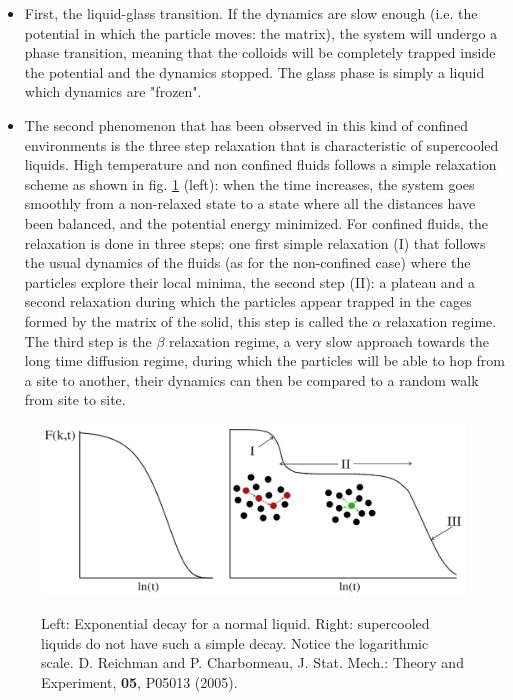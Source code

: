 \documentclass[a4paper,12pt]{article}
\newcommand{\jline}{\vspace{10pt}}
\begin{document}
\begin{itemize}

\item First, the liquid-glass transition. If the dynamics are slow enough (i.e. the potential in which the particle moves: the matrix), the system will undergo a phase transition, meaning that the colloids will be completely trapped inside the potential and the dynamics stopped. The glass phase is simply a liquid which dynamics are "frozen".\jline

\item The second phenomenon that has been observed in this kind of confined environments is the three step relaxation that is characteristic of supercooled liquids. High temperature and non confined fluids follows a simple relaxation scheme as shown in fig. \ref{relaxations} (left): when the time increases, the system goes smoothly from a non-relaxed state to a state where all the distances have been balanced, and the potential energy minimized. For confined fluids, the relaxation is done in three steps: one first simple relaxation (I) that follows the usual dynamics of the fluids (as for the non-confined case) where the particles explore their local minima, the second step (II): a plateau and a second relaxation during which the particles appear trapped in the cages formed by the matrix of the solid, this step is called the $\alpha$ relaxation regime. The third step is the $\beta$ relaxation regime, a very slow approach towards the long time diffusion regime, during which the particles will be able to hop from a site to another, their dynamics can then be compared to a random walk from site to site.\jline
\end{itemize}

\begin{figure}[htbp]
\centering
\subfigure
{\includegraphics[width=14cm]{pics/relaxations.png}}
\caption{Left: Exponential decay for a normal liquid. Right: supercooled liquids do not have such a simple decay. Notice the logarithmic scale. D. Reichman and P. Charbonneau, J. Stat. Mech.: Theory and Experiment, \textbf{05}, P05013 (2005).}
\label{relaxations}
\end{figure}
\end{document}
